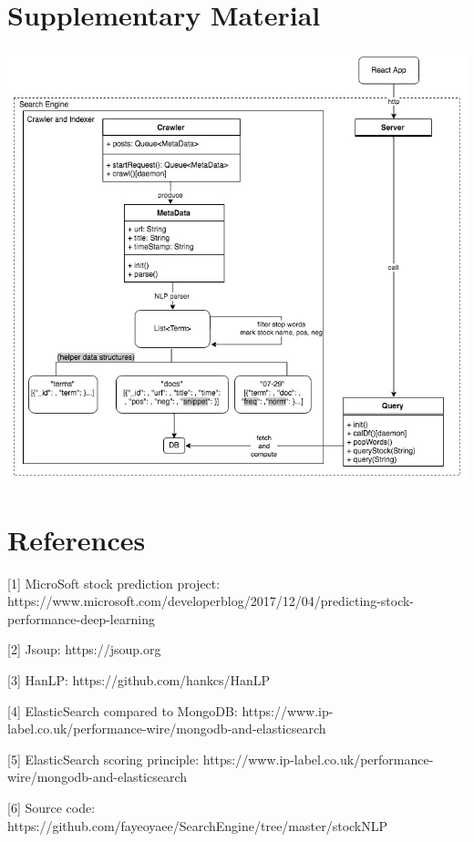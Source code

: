\documentclass{article}
\begin{document}
\section{Supplementary Material}
\includegraphics[width=7in]{StockNLP_Pipeline}

\section{References}
\vspace{-5pt}\hspace{-15pt}[1] MicroSoft stock prediction project: https://www.microsoft.com/developerblog/2017/12/04/predicting-stock-performance-deep-learning\par
\vspace{-5pt}\hspace{-15pt}[2] Jsoup: https://jsoup.org\par
\vspace{-5pt}\hspace{-15pt}[3] HanLP: https://github.com/hankcs/HanLP\par
\vspace{-5pt}\hspace{-15pt}[4] ElasticSearch compared to MongoDB: https://www.ip-label.co.uk/performance-wire/mongodb-and-elasticsearch\par
\vspace{-5pt}\hspace{-15pt}[5] ElasticSearch scoring principle: https://www.ip-label.co.uk/performance-wire/mongodb-and-elasticsearch\par
\vspace{-5pt}\hspace{-15pt}[6] Source code: https://github.com/fayeoyaee/SearchEngine/tree/master/stockNLP\par
\end{document}
